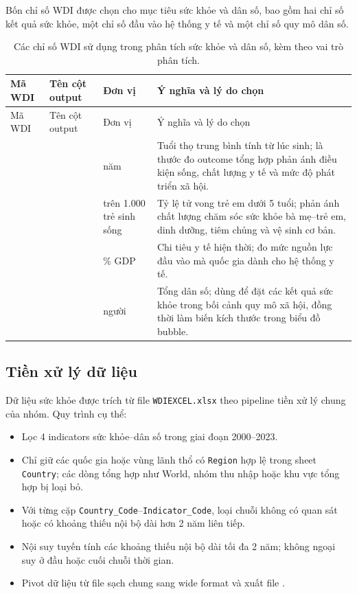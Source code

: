 Bốn chỉ số WDI được chọn cho mục tiêu sức khỏe và dân số, bao gồm hai chỉ số kết quả sức khỏe, một chỉ số đầu vào hệ thống y tế và một chỉ số quy mô dân số.

\begin{longtable}{L{3.8cm}L{3.5cm}L{1.3cm}L{5cm}}
\caption{Các chỉ số WDI sử dụng trong phân tích sức khỏe và dân số, kèm theo vai trò phân tích.}
\label{tab:health-indicators}\\
\toprule
Mã WDI & Tên cột output & Đơn vị & Ý nghĩa và lý do chọn \\
\midrule
\endfirsthead
\toprule
Mã WDI & Tên cột output & Đơn vị & Ý nghĩa và lý do chọn \\
\midrule
\endhead
{} &  & năm & Tuổi thọ trung bình tính từ lúc sinh; là thước đo outcome tổng hợp phản ánh điều kiện sống, chất lượng y tế và mức độ phát triển xã hội. \\
 &  & trên 1.000 trẻ sinh sống & Tỷ lệ tử vong trẻ em dưới 5 tuổi; phản ánh chất lượng chăm sóc sức khỏe bà mẹ--trẻ em, dinh dưỡng, tiêm chủng và vệ sinh cơ bản. \\
 &  & \% GDP & Chi tiêu y tế hiện thời; đo mức nguồn lực đầu vào mà quốc gia dành cho hệ thống y tế. \\
 &  & người & Tổng dân số; dùng để đặt các kết quả sức khỏe trong bối cảnh quy mô xã hội, đồng thời làm biến kích thước trong biểu đồ bubble. \\
\bottomrule
\end{longtable}

\subsection{Tiền xử lý dữ liệu}

Dữ liệu sức khỏe được trích từ file \texttt{WDIEXCEL.xlsx} theo pipeline tiền xử lý chung của nhóm. Quy trình cụ thể:

\begin{itemize}
    \item Lọc 4 indicators sức khỏe--dân số trong giai đoạn 2000--2023.
    \item Chỉ giữ các quốc gia hoặc vùng lãnh thổ có \texttt{Region} hợp lệ trong sheet \texttt{Country}; các dòng tổng hợp như World, nhóm thu nhập hoặc khu vực tổng hợp bị loại bỏ.
    \item Với từng cặp \texttt{Country\_Code}--\texttt{Indicator\_Code}, loại chuỗi không có quan sát hoặc có khoảng thiếu nội bộ dài hơn 2 năm liên tiếp.
    \item Nội suy tuyến tính các khoảng thiếu nội bộ dài tối đa 2 năm; không ngoại suy ở đầu hoặc cuối chuỗi thời gian.
    \item Pivot dữ liệu từ file sạch chung sang wide format và xuất file .
\end{itemize}

